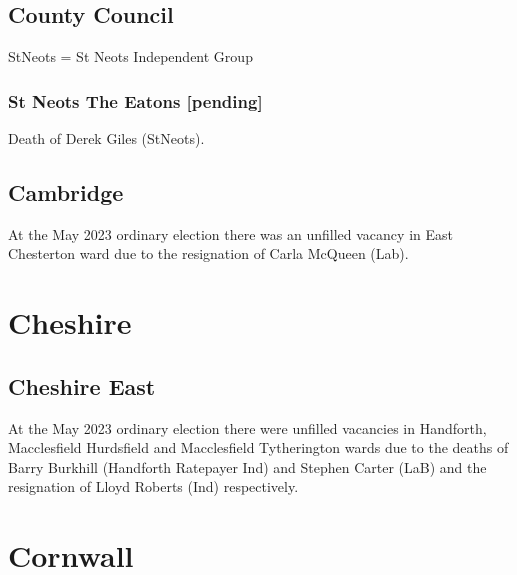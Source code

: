 \documentclass[a4paper,openany]{book}
\begin{document}
\begin{resultsiii}
\subsection*{County Council}

StNeots = St Neots Independent Group

\subsubsection*{St Neots The Eatons \hspace*{\fill}\nolinebreak[1]%
	\enspace\hspace*{\fill}
	[pending]}


Death of Derek Giles (StNeots).

\subsection*{Cambridge}

At the May 2023 ordinary election there was an unfilled vacancy in East Chesterton ward due to the resignation of Carla McQueen (Lab).%

\section{Cheshire}

\subsection*{Cheshire East}

At the May 2023 ordinary election there were unfilled vacancies in Handforth, Macclesfield Hurdsfield and Macclesfield Tytherington wards due to the deaths of Barry Burkhill (Handforth Ratepayer Ind) and Stephen Carter (LaB) and the resignation of Lloyd Roberts (Ind) respectively.%

\section{Cornwall}


\end{resultsiii}
\end{document}
